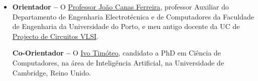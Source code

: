 \documentclass[a4paper, onecolumn, 10pt]{article}
\begin{document}
	\begin{itemize}
		\item
			\textbf{Orientador --} O \href{https://sigarra.up.pt/feup/pt/func_geral.formview?p_codigo=210963}{Professor João Canas Ferreira}, professor Auxiliar do Departamento de Engenharia Electrotécnica e de Computadores da Faculdade de Engenharia da Universidade do Porto, e meu antigo docente da UC de \href{https://sigarra.up.pt/feup/pt/UCURR_GERAL.FICHA_UC_VIEW?pv_ocorrencia_id=352359}{Projecto de Circuitos VLSI}.

			\textbf{Co-Orientador --} O \href{http://www.cl.cam.ac.uk/~ijpdmt2/}{Ivo Timóteo}, candidato a PhD em Ciência de Computadores, na área de Inteligência Artificial, na Universidade de Cambridge, Reino Unido.
	
	\end{itemize}	
\end{document}
